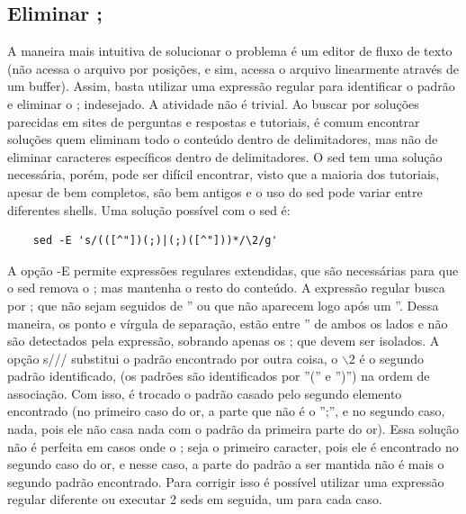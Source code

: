 \documentclass[oneside, 11 pt]{article}
\begin{document}
	\subsection{Eliminar ;}
	A maneira mais intuitiva de solucionar o problema é um editor de fluxo de texto (não acessa o arquivo por posições, e sim, acessa o arquivo linearmente através de um buffer). Assim, basta utilizar uma expressão regular \cite{regex} para identificar o padrão e eliminar o ; indesejado. A atividade não é trivial. Ao buscar por soluções parecidas em sites de perguntas e respostas e tutoriais, é comum encontrar soluções quem eliminam todo o conteúdo dentro de delimitadores, mas não de eliminar caracteres específicos dentro de delimitadores. O sed tem uma solução necessária, porém, pode ser difícil encontrar, visto que a maioria dos tutoriais, apesar de bem completos, são bem antigos e o uso do sed pode variar entre diferentes shells. Uma solução possível com o sed é:
	\begin{lstlisting}
	sed -E 's/(([^"])(;)|(;)([^"]))*/\2/g'
	\end{lstlisting}
	A opção -E permite expressões regulares extendidas, que são necessárias para que o sed remova o ; mas mantenha o resto do conteúdo. A expressão regular busca por ; que não sejam seguidos de '' ou que não aparecem logo após um ''. Dessa maneira, os ponto e vírgula de separação, estão entre '' de ambos os lados e não são detectados pela expressão, sobrando apenas os ; que devem ser isolados. A opção s/// substitui o padrão encontrado por outra coisa, o $\backslash$2 é o segundo padrão identificado, (os padrões são identificados por ''('' e '')'') na ordem de associação. Com isso, é trocado o padrão casado pelo segundo elemento encontrado (no primeiro caso do or, a parte que não é o '';'', e no segundo caso, nada, pois ele não casa nada com o padrão da primeira parte do or). Essa solução não é perfeita em casos onde o ; seja o primeiro caracter, pois ele é encontrado no segundo caso do or, e nesse caso, a parte do padrão a ser mantida não é mais o segundo padrão encontrado. Para corrigir isso é possível utilizar uma expressão regular diferente ou executar 2 seds em seguida, um para cada caso.
\end{document}
